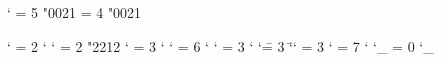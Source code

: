 
\Umathcode `\! = 5 \ordfam "0021
\Umathchardef \mathexclam = 4 \ordfam "0021

\Umathcode `\* = 2 \binfam `\*
\Umathcode `\- = 2 \binfam "2212
\Umathcode `\: = 3 \ordfam `\:
\Umathcode `\; = 6 \ordfam `\;
\Umathcode `\< = 3 \binfam `\<
\Umathcode `\= = 3 \binfam `\=
\Umathcode `\> = 3 \binfam `\>
\Umathchardef \colon = 7 \ordfam `\:
\Umathcode `\_ = 0 \ordfam `\_

